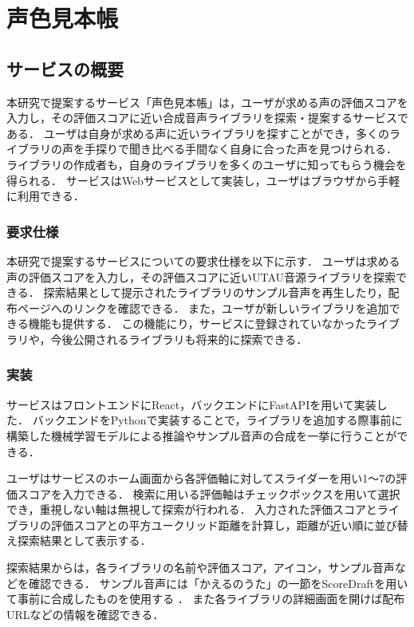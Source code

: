 \chapter{声色見本帳}
\thispagestyle{myheadings}

\section{サービスの概要}
本研究で提案するサービス「声色見本帳」は，ユーザが求める声の評価スコアを入力し，その評価スコアに近い合成音声ライブラリを探索・提案するサービスである．
ユーザは自身が求める声に近いライブラリを探すことができ，多くのライブラリの声を手探りで聞き比べる手間なく自身に合った声を見つけられる．
ライブラリの作成者も，自身のライブラリを多くのユーザに知ってもらう機会を得られる．
サービスはWebサービスとして実装し，ユーザはブラウザから手軽に利用できる．

\subsection{要求仕様}
本研究で提案するサービスについての要求仕様を以下に示す．
ユーザは求める声の評価スコアを入力し，その評価スコアに近いUTAU音源ライブラリを探索できる．
探索結果として提示されたライブラリのサンプル音声を再生したり，配布ページへのリンクを確認できる．
また，ユーザが新しいライブラリを追加できる機能も提供する．
この機能にり，サービスに登録されていなかったライブラリや，今後公開されるライブラリも将来的に探索できる．

\subsection{実装}
サービスはフロントエンドにReact，バックエンドにFastAPIを用いて実装した．
バックエンドをPythonで実装することで，ライブラリを追加する際事前に構築した機械学習モデルによる推論やサンプル音声の合成を一挙に行うことができる．

ユーザはサービスのホーム画面から各評価軸に対してスライダーを用い1〜7の評価スコアを入力できる．
検索に用いる評価軸はチェックボックスを用いて選択でき，重視しない軸は無視して探索が行われる．
入力された評価スコアとライブラリの評価スコアとの平方ユークリッド距離を計算し，距離が近い順に並び替え探索結果として表示する．

探索結果からは，各ライブラリの名前や評価スコア，アイコン，サンプル音声などを確認できる．
サンプル音声には「かえるのうた」の一節をScoreDraftを用いて事前に合成したものを使用する
．
また各ライブラリの詳細画面を開けば配布URLなどの情報を確認できる．

